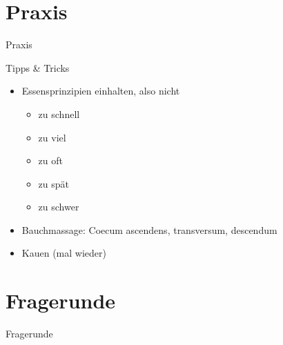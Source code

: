 \documentclass[xcolor=dvipsnames]{beamer}
\begin{document}
    \section{Praxis}
    {
        \begin{frame}
            \begin{center}
                \Huge Praxis
            \end{center}
        \end{frame}
    }

    \begin{frame}{Tipps \& Tricks}
        \begin{itemize}
            \setlength\itemsep{1em}
            \item Essensprinzipien einhalten, also nicht
            \begin{itemize}
                \item zu schnell
                \item zu viel
                \item zu oft
                \item zu spät
                \item zu schwer
            \end{itemize}
            \item Bauchmassage: Coecum ascendens, transversum, descendum
            \item Kauen (mal wieder)
        \end{itemize}
    \end{frame}

    \section{Fragerunde}
    {
        \begin{frame}
            \begin{center}
                \Huge Fragerunde
            \end{center}
        \end{frame}
    }
\end{document}
